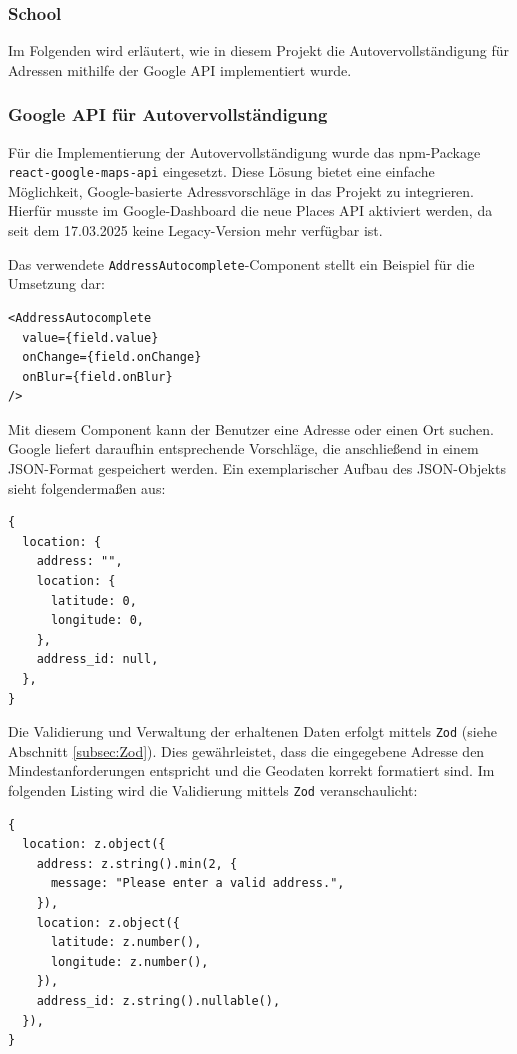 \begin{inhalt}
\subsubsection{School}






Im Folgenden wird erläutert, wie in diesem Projekt die Autovervollständigung für Adressen mithilfe der Google API implementiert wurde.

\subsubsection{Google API für Autovervollständigung}

Für die Implementierung der Autovervollständigung wurde das npm-Package \texttt{react-google-maps-api} eingesetzt. Diese Lösung bietet eine einfache Möglichkeit, Google-basierte Adressvorschläge in das Projekt zu integrieren. Hierfür musste im Google-Dashboard die neue Places API aktiviert werden, da seit dem 17.03.2025 keine Legacy-Version mehr verfügbar ist.

Das verwendete \texttt{AddressAutocomplete}-Component stellt ein Beispiel für die Umsetzung dar:

\begin{lstlisting}[style=mytsx]
<AddressAutocomplete
  value={field.value}
  onChange={field.onChange}
  onBlur={field.onBlur}
/>
\end{lstlisting}

Mit diesem Component kann der Benutzer eine Adresse oder einen Ort suchen. Google liefert daraufhin entsprechende Vorschläge, die anschließend in einem JSON-Format gespeichert werden. Ein exemplarischer Aufbau des JSON-Objekts sieht folgendermaßen aus:

\begin{lstlisting}[style=myjson]
{
  location: {
    address: "",
    location: {
      latitude: 0,
      longitude: 0,
    },
    address_id: null,
  },
}
\end{lstlisting}

Die Validierung und Verwaltung der erhaltenen Daten erfolgt mittels \texttt{Zod} (siehe Abschnitt \ref{subsec:Zod}). Dies gewährleistet, dass die eingegebene Adresse den Mindestanforderungen entspricht und die Geodaten korrekt formatiert sind. Im folgenden Listing wird die Validierung mittels \texttt{Zod} veranschaulicht:

\begin{lstlisting}[style=myjson]
{
  location: z.object({
    address: z.string().min(2, {
      message: "Please enter a valid address.",
    }),
    location: z.object({
      latitude: z.number(),
      longitude: z.number(),
    }),
    address_id: z.string().nullable(),
  }),
}
\end{lstlisting}


\end{inhalt}
